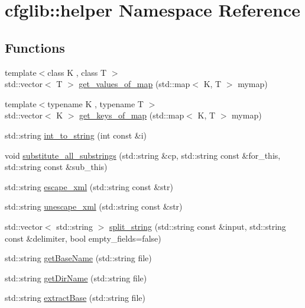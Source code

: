 \hypertarget{namespacecfglib_1_1helper}{}\section{cfglib\+:\+:helper Namespace Reference}
\label{namespacecfglib_1_1helper}
\subsection*{Functions}
\begin{DoxyCompactItemize}
\item 
{\footnotesize template$<$class K , class T $>$ }\\std\+::vector$<$ T $>$ \hyperlink{namespacecfglib_1_1helper_a5987d38b64c30a3c137e126f8fb9c40e}{get\+\_\+values\+\_\+of\+\_\+map} (std\+::map$<$ K, T $>$ mymap)
\item 
{\footnotesize template$<$typename K , typename T $>$ }\\std\+::vector$<$ K $>$ \hyperlink{namespacecfglib_1_1helper_aabf0f4f63ae88972fdf9f6f3d4bf76e4}{get\+\_\+keys\+\_\+of\+\_\+map} (std\+::map$<$ K, T $>$ mymap)
\item 
std\+::string \hyperlink{namespacecfglib_1_1helper_ae880d04f2f8ac3fecbda16531db992b5}{int\+\_\+to\+\_\+string} (int const \&i)
\item 
void \hyperlink{namespacecfglib_1_1helper_a881befb2313de589fc1f352316fa139f}{substitute\+\_\+all\+\_\+substrings} (std\+::string \&cp, std\+::string const \&for\+\_\+this, std\+::string const \&sub\+\_\+this)
\item 
std\+::string \hyperlink{namespacecfglib_1_1helper_aba2387b203342db23a47897b59779631}{escape\+\_\+xml} (std\+::string const \&str)
\item 
std\+::string \hyperlink{namespacecfglib_1_1helper_a4bde730048efc8d68682f368b010f18d}{unescape\+\_\+xml} (std\+::string const \&str)
\item 
std\+::vector$<$ std\+::string $>$ \hyperlink{namespacecfglib_1_1helper_a15df8b46c248e364b8e4e522bfbde414}{split\+\_\+string} (std\+::string const \&input, std\+::string const \&delimiter, bool empty\+\_\+fields=false)
\item 
std\+::string \hyperlink{namespacecfglib_1_1helper_a7cf8c4c7057fb03857f0f9844ffcca62}{get\+Base\+Name} (std\+::string file)
\item 
std\+::string \hyperlink{namespacecfglib_1_1helper_ab650f4d56d31c95fb20f656b620fecae}{get\+Dir\+Name} (std\+::string file)
\item 
std\+::string \hyperlink{namespacecfglib_1_1helper_a6fa2db3729eb85015591dea07b7f0b69}{extract\+Base} (std\+::string file)
\end{DoxyCompactItemize}


